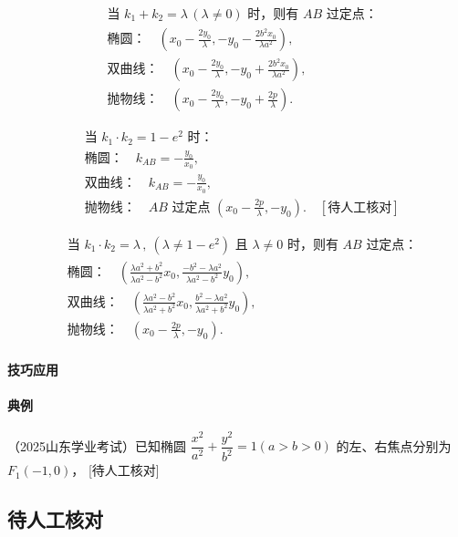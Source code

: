 \documentclass[UTF8,a4paper,11pt]{ctexart}
\begin{document}
\begin{align*}
&\text{当 } k_1+k_2=\lambda\,(\lambda\neq 0) \text{ 时，则有 } AB \text{ 过定点：}\\
&\text{椭圆：}\quad \left(x_0-\frac{2y_0}{\lambda},-y_0-\frac{2b^2x_0}{\lambda a^2}\right),\\
&\text{双曲线：}\quad \left(x_0-\frac{2y_0}{\lambda},-y_0+\frac{2b^2x_0}{\lambda a^2}\right),\\
&\text{抛物线：}\quad \left(x_0-\frac{2y_0}{\lambda},-y_0+\frac{2p}{\lambda}\right).
\end{align*}

\begin{align*}
&\text{当 } k_1\cdot k_2=1-e^2 \text{ 时：}\\
&\text{椭圆：}\quad k_{AB}=-\frac{y_0}{x_0},\\
&\text{双曲线：}\quad k_{AB}=-\frac{y_0}{x_0},\\
&\text{抛物线：}\quad AB \text{ 过定点 } \left(x_0-\frac{2p}{\lambda},-y_0\right). \quad [待人工核对]
\end{align*}

\begin{align*}
&\text{当 } k_1\cdot k_2=\lambda\,,\ (\lambda\neq 1-e^2) \text{ 且 } \lambda\neq 0 \text{ 时，则有 } AB \text{ 过定点：}\\
&\text{椭圆：}\quad \left(\frac{\lambda a^2+b^2}{\lambda a^2-b^2}x_0,\frac{-b^2-\lambda a^2}{\lambda a^2-b^2}y_0\right),\\
&\text{双曲线：}\quad \left(\frac{\lambda a^2-b^2}{\lambda a^2+b^2}x_0,\frac{b^2-\lambda a^2}{\lambda a^2+b^2}y_0\right),\\
&\text{抛物线：}\quad \left(x_0-\frac{2p}{\lambda},-y_0\right).
\end{align*}

\paragraph{技巧应用}
\paragraph{典例}
（2025山东学业考试）已知椭圆 $\dfrac{x^2}{a^2}+\dfrac{y^2}{b^2}=1(a>b>0)$ 的左、右焦点分别为 $F_1(-1,0)$，
[待人工核对]

\subsection*{待人工核对}
\end{document}
